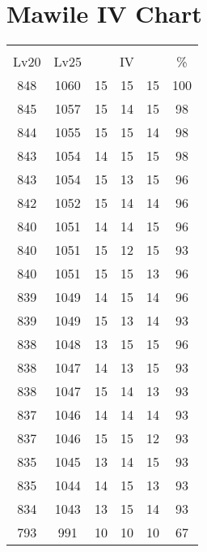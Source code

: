 \documentclass{article}%
\begin{document}
%
\normalsize%
\section{Mawile IV Chart}%
\label{sec:Mawile IV Chart}%
\renewcommand{\arraystretch}{1.5}%
\begin{tabular}{|c|c|c|c|c|c|}%
\hline%
\multicolumn{6}{|c|}{\textcolor{white}{ 
\linebreak{Mawile}
}%
\cellcolor{black}}\\%
\multicolumn{1}{|c}{Lv20}&\multicolumn{1}{c|}{Lv25}&\multicolumn{3}{c|}{IV}&\multicolumn{1}{|c|}{\%}\\%
\hline%
\rowcolor{color100}%
848&1060&15&15&15&100\\%
\hline%
\rowcolor{color98}%
845&1057&15&14&15&98\\%
\hline%
\rowcolor{color98}%
844&1055&15&15&14&98\\%
\hline%
\rowcolor{color98}%
843&1054&14&15&15&98\\%
\hline%
\rowcolor{color96}%
843&1054&15&13&15&96\\%
\hline%
\rowcolor{color96}%
842&1052&15&14&14&96\\%
\hline%
\rowcolor{color96}%
840&1051&14&14&15&96\\%
\hline%
\rowcolor{color93}%
840&1051&15&12&15&93\\%
\hline%
\rowcolor{color96}%
840&1051&15&15&13&96\\%
\hline%
\rowcolor{color96}%
839&1049&14&15&14&96\\%
\hline%
\rowcolor{color93}%
839&1049&15&13&14&93\\%
\hline%
\rowcolor{color96}%
838&1048&13&15&15&96\\%
\hline%
\rowcolor{color93}%
838&1047&14&13&15&93\\%
\hline%
\rowcolor{color93}%
838&1047&15&14&13&93\\%
\hline%
\rowcolor{color93}%
837&1046&14&14&14&93\\%
\hline%
\rowcolor{color93}%
837&1046&15&15&12&93\\%
\hline%
\rowcolor{color93}%
835&1045&13&14&15&93\\%
\hline%
\rowcolor{color93}%
835&1044&14&15&13&93\\%
\hline%
\rowcolor{color93}%
834&1043&13&15&14&93\\%
\hline%
\rowcolor{color91}%
793&991&10&10&10&67\\%
\end{tabular}

%
\end{document}
